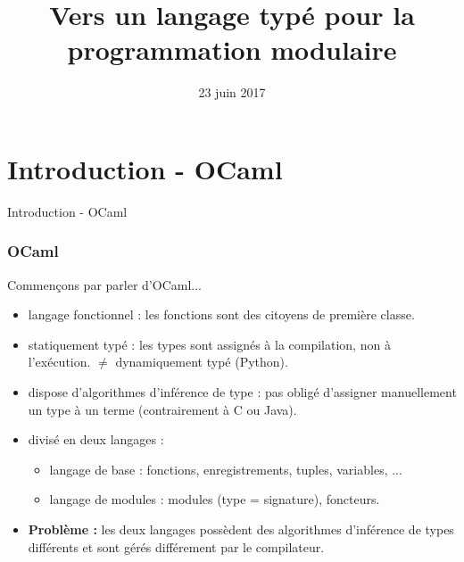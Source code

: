 \documentclass{beamer}
\begin{document}
\title{Vers un langage typé pour la programmation modulaire}
\date{23 juin 2017}

\maketitle

\begin{frame}
	\tableofcontents
\end{frame}

\section{Introduction - OCaml}

\begin{frame}
	\begin{center}
		\Huge{Introduction - OCaml}
	\end{center}
\end{frame}

\begin{frame}
  \frametitle{OCaml}
  Commençons par parler d'OCaml...
	\begin{center}
    \begin{itemize}
    \item langage fonctionnel : les fonctions sont des citoyens de première classe.
    \item statiquement typé : les types sont assignés à la compilation, non à
      l'exécution. $\neq$ dynamiquement typé (Python).
    \item dispose d'algorithmes d'inférence de type : pas obligé d'assigner
      manuellement un type à un terme (contrairement à C ou Java).
    \item divisé en deux \og langages \fg :
      \begin{itemize}
      \item langage de base : fonctions, enregistrements, tuples, variables, ...
      \item langage de modules : modules (type = signature), foncteurs.
      \end{itemize}
    \item \textbf{Problème : }les deux langages possèdent des algorithmes d'inférence de types
      différents et sont gérés différement par le compilateur.
    \end{itemize}
	\end{center}
\end{frame}

%
\end{document}
